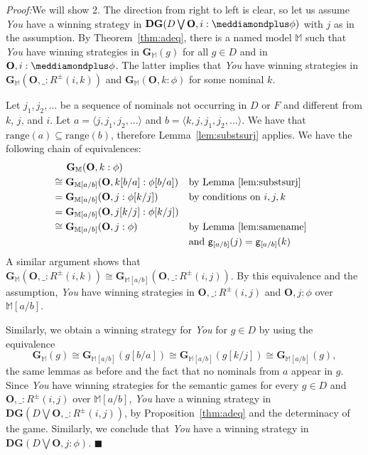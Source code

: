 \documentclass{easychair}
\newcommand{\You}{\emph{You}\xspace}
\newcommand{\M}{\mathbb{M}}
\newcommand{\g}{\mathsf{g}}
\renewcommand{\qed}{\hfill$\blacksquare$}
\renewenvironment{proof}{\noindent\textit{Proof:}\quad}{\qed}
\newcommand{\dplus}{\meddiamondplus}
\begin{document}
\begin{proof}[Proof of Proposition~\ref{prop:bestchoice}]
We will show 2. The direction from right to left is clear, so let us assume \You have a winning strategy in $\mathbf{DG}(D \bigvee \mathbf{O},i:\dplus \phi)$ with $j$ as in the assumption. By Theorem~\ref{thm:adeq}, there is a named model $\mathbb{M}$ such that \You have winning strategies in $\mathbf{G}_\mathbb{M}(g)$ for all $g\in  D$ and in $\mathbf{O}, i: \dplus \phi$. The latter implies that \You have winning strategies in $\mathbf{G}_\mathbb{M}(\mathbf{O}, \_:  R^\pm(i,k))$ and $\mathbf{G}_\mathbb{M}(\mathbf{O}, k: \phi)$ for some nominal $k$. 

Let $j_1, j_2, ...$ be a sequence of nominals not occurring in $D$ or $F$ and different from $k$, $j$, and $i$. Let $a = \langle j,j_1, j_2,...\rangle$ and $b = \langle k,j,j_1,j_2,...\rangle$. We have that $\mathrm{range}(a)\subseteq \mathrm{range}(b)$, therefore Lemma~\ref{lem:substsurj} applies.  We have the following chain of equivalences:
\begin{align*}
    &\hspace{5mm}\mathbf{G}_\mathbb{M}(\mathbf{O},k: \phi) \\
    &\cong \mathbf{G}_{\mathbb{M}[a/b]}(\mathbf{O},k[b/a]:\phi[b/a]) &&\text{by Lemma~\ref{lem:substsurj}}\\
    &= \mathbf{G}_{\mathbb{M}[a/b]}(\mathbf{O},j:\phi[k/j]) &&\text{by conditions on } i,j,k\\
    &= \mathbf{G}_{\mathbb{M}[a/b]}(\mathbf{O},j[k/j]:\phi[k/j])\\
    &\cong \mathbf{G}_{\mathbb{M}[a/b]}(\mathbf{O},j: \phi) &&\text{by Lemma~\ref{lem:samename}}\\&&&\text{and }\g_{[a/b]}(j)=\g_{[a/b]}(k)
\end{align*}
A similar argument shows that $\mathbf{G}_\mathbb{M}(\mathbf{O},\_: R^\pm(i,k))\cong \mathbf{G}_{\mathbb{M}[a/b]}(\mathbf{O},\_: R^\pm(i,j))$. By this equivalence and the assumption, \You have winning strategies in $\mathbf{O},\_:R^\pm(i,j)$ and $\mathbf{O},j:\phi$ over $\mathbb{M}[a/b]$.

Similarly, we obtain a winning strategy for \You for $g\in D$ by using the equivalence
\[
\mathbf{G}_\mathbb{M}(g)\cong 
\mathbf{G}_{\mathbb{M}[a/b]}(g[b/a]) \cong 
\mathbf{G}_{\mathbb{M}[a/b]}(g[k/j])\cong 
\mathbf{G}_{\mathbb{M}[a/b]}(g),
\]
the same lemmas as before and the fact that no nominals from $a$ appear in $g$. Since \You have winning strategies for the semantic games for every $g\in D$ and $\mathbf{O},\_:R^\pm(i,j)$ over $\M[a/b]$, \You have a winning strategy in $\mathbf{DG}(D\bigvee \mathbf{O},\_:R^\pm(i,j))$, by Proposition~\ref{thm:adeq} and the determinacy of the game. Similarly, we conclude that \You  have a winning strategy in $\mathbf{DG}(D\bigvee \mathbf{O},j:\phi)$.
\end{proof}
\end{document}
